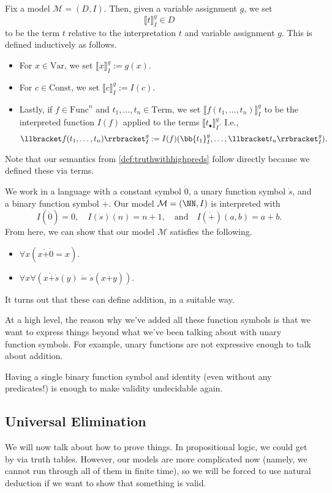 \begin{defi}[Denotation]
	Fix a model $\mathcal M=(D,I)$. Then, given a variable assignment $g$, we set
	\[\llbracket t\rrbracket_I^g\in D\]
	to be the term $t$ relative to the interpretation $t$ and variable assignment $g$. This is defined inductively as follows.
	\begin{itemize}
		\item For $x\in\mathrm{Var}$, we set $\llbracket x\rrbracket_I^g:=g(x)$.
		\item For $c\in\mathrm{Const}$, we set $\llbracket c\rrbracket_I^g:=I(c)$.
		\item Lastly, if $f\in\mathrm{Func}^n$ and $t_1,\ldots,t_n\in\mathrm{Term}$, we set $\llbracket f(t_1,\ldots,t_n)\rrbracket_I^g$ to be the interpreted function $I(f)$ applied to the terms $\llbracket t_\bullet\rrbracket_I^g$. I.e.,
		\[\llbracket f(t_1,\ldots,t_n)\rrbracket_I^g:=I(f)(\bb{t_1}_I^g,\ldots,\llbracket t_n\rrbracket_I^g).\]
	\end{itemize}
\end{defi}
Note that our semantics from \autoref{def:truthwithhighpreds} follow directly because we defined these via terms.
\begin{example}
	We work in a language with a constant symbol $\dot0$, a unary function symbol $\dot s$, and a binary function symbol $\dot+$. Our model $\mathcal M=(\NN,I)$ is interpreted with
	\[I(\dot0)=0,\quad I(\dot s)(n)=n+1,\quad\text{and}\quad I(\dot+)(a,b)=a+b.\]
	From here, we can show that our model $\mathcal M$ satisfies the following.
	\begin{itemize}
		\item $\forall x(x\dot+\dot0=x)$.
		\item $\forall x\forall(x\dot+\dot s(y)\dot=\dot s(x\dot+y))$.
	\end{itemize}
	It turns out that these can define addition, in a suitable way.
\end{example}
At a high level, the reason why we've added all these function symbols is that we want to express things beyond what we've been talking about with unary function symbols. For example, unary functions are not expressive enough to talk about addition.
\begin{remark}
	Having a single binary function symbol and identity (even without any predicates!) is enough to make validity undecidable again.
\end{remark}

\subsection{Universal Elimination}
We will now talk about how to prove things. In propositional logic, we could get by via truth tables. However, our models are more complicated now (namely, we cannot run through all of them in finite time), so we will be forced to use natural deduction if we want to show that something is valid.

